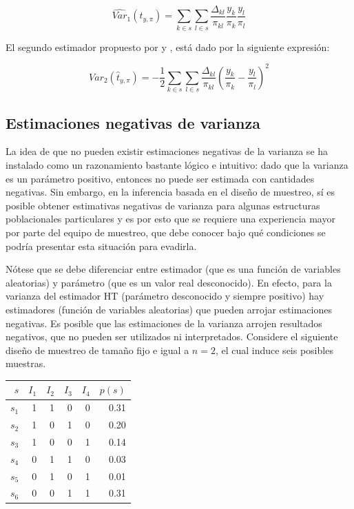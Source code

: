 \documentclass[
  12pt,
  spanish,
]{book}
\begin{document}
\[
\widehat{Var}_1(\hat{t}_{y, \pi})=
\sum_{k\in s}\sum_{l\in s} \frac{\Delta_{kl}}{\pi_{kl}}\frac{y_k}{\pi_k}\frac{y_l}{\pi_l}
\]

El segundo estimador propuesto por \citet{Sen} y \citet{YG}, está dado por la siguiente expresión:

\[
\widehat{Var}_2(\hat{t}_{y, \pi})=-\frac{1}{2}
\sum_{k\in s}\sum_{l\in s} \frac{\Delta_{kl}}{\pi_{kl}}\left(\frac{y_k}{\pi_k}-\frac{y_l}{\pi_l}\right)^2
\]

\hypertarget{estimaciones-negativas-de-varianza}{%
\subsection{Estimaciones negativas de varianza}\label{estimaciones-negativas-de-varianza}}

La idea de que no pueden existir estimaciones negativas de la varianza se ha instalado como un razonamiento bastante lógico e intuitivo: dado que la varianza es un parámetro positivo, entonces no puede ser estimada con cantidades negativas. Sin embargo, en la inferencia basada en el diseño de muestreo, sí es posible obtener estimativas negativas de varianza para algunas estructuras poblacionales particulares y es por esto que se requiere una experiencia mayor por parte del equipo de muestreo, que debe conocer bajo qué condiciones se podría presentar esta situación para evadirla.

Nótese que se debe diferenciar entre estimador (que es una función de variables aleatorias) y parámetro (que es un valor real desconocido). En efecto, para la varianza del estimador HT (parámetro desconocido y siempre positivo) hay estimadores (función de variables aleatorias) que pueden arrojar estimaciones negativas. Es posible que las estimaciones de la varianza arrojen resultados negativos, que no pueden ser utilizados ni interpretados. Considere el siguiente diseño de muestreo de tamaño fijo e igual a \(n=2\), el cual induce seis posibles muestras.

\begin{longtable}[]{@{}rrrrrr@{}}
\toprule
\(s\) & \(I_1\) & \(I_2\) & \(I_3\) & \(I_4\) & \(p(s)\) \\
\midrule
\endhead
\(s_1\) & 1 & 1 & 0 & 0 & 0.31 \\
\(s_2\) & 1 & 0 & 1 & 0 & 0.20 \\
\(s_3\) & 1 & 0 & 0 & 1 & 0.14 \\
\(s_4\) & 0 & 1 & 1 & 0 & 0.03 \\
\(s_5\) & 0 & 1 & 0 & 1 & 0.01 \\
\(s_6\) & 0 & 0 & 1 & 1 & 0.31 \\
\bottomrule
\end{longtable}
\end{document}
